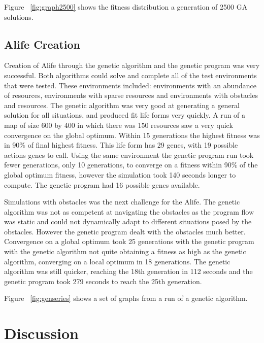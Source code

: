 \documentclass[12pt]{article}
\begin{document}
Figure ~\ref{fig:graph2500} shows the fitness distribution a generation of 2500 GA solutions. 

\subsection{Alife Creation}

Creation of Alife through the genetic algorithm and the genetic program was very successful. Both algorithms could solve and complete all of the test
environments that were tested. These environments included: environments with an abundance of resources, environments with sparse resources and 
environments with obstacles and resources. The genetic algorithm was very good at generating a general solution for all situations, and produced fit life forms
very quickly. A run of a map of size 600 by 400 in which there was 150 resources saw a very quick convergence on the global optimum. Within 
15 generations the highest fitness was in 90\% of final highest fitness. This life form has 29 genes, with 19 possible actions genes to call.
Using the same environment the genetic program run took fewer generations, only 10 generations, to converge on a fitness within 90\% of the
global optimum fitness, however the simulation took 140 seconds longer to compute. The genetic program had 16 possible genes available. 

Simulations with obstacles was the next challenge for the Alife. The genetic algorithm was not as competent at navigating the obstacles as the
program flow was static and could not dynamically adapt to different situations posed by the obstacles. However the genetic program dealt with
the obstacles much better. Convergence on a global optimum took 25 generations with the genetic program with the genetic algorithm not quite obtaining
a fitness as high as the genetic algorithm, converging on a local optimum in 18 generations. The genetic algorithm was still quicker, reaching the 18th generation
in 112 seconds and the genetic program took 279 seconds to reach the 25th generation.

Figure ~\ref{fig:genseries} shows a set of graphs from a run of a genetic algorithm. 




\section{Discussion}
\end{document}
